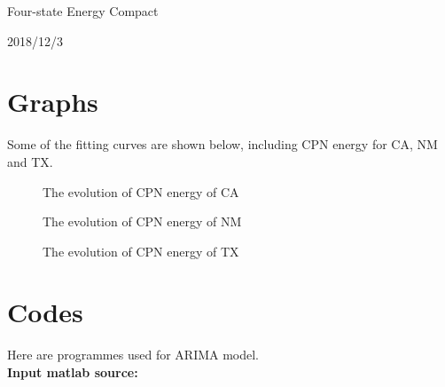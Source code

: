 \documentclass{mcmthesis}
\begin{document}
 Four-state Energy Compact
 
 2018/12/3
 
\newpage




\newpage

\begin{appendices}

\section{ Graphs}

Some of the fitting curves are shown below, including CPN energy for CA, NM and TX.

\begin{figure}[H]
  \caption{The evolution of CPN energy of CA}
\end{figure}

\begin{figure}[H]
  \caption{The evolution of CPN energy of NM}
\end{figure}

\begin{figure}[H]
  \caption{The evolution of CPN energy of TX}
\end{figure}

\section{Codes}

Here are programmes used for ARIMA model.\\

\textbf{\textcolor[rgb]{0.98,0.00,0.00}{Input matlab source:}}


\end{appendices}
\end{document}
